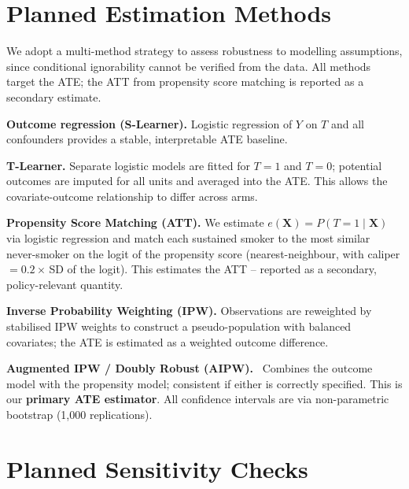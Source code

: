 \documentclass[11pt]{article}
\begin{document}
\section{Planned Estimation Methods}

We adopt a multi-method strategy to assess robustness to modelling assumptions, since conditional ignorability cannot be verified from the data. All methods target the ATE; the ATT from propensity score matching is reported as a secondary estimate.

\textbf{Outcome regression (S-Learner).} Logistic regression of $Y$ on $T$ and all confounders provides a stable, interpretable ATE baseline.

\textbf{T-Learner.} Separate logistic models are fitted for $T=1$ and $T=0$; potential outcomes are imputed for all units and averaged into the ATE. This allows the covariate-outcome relationship to differ across arms.

\textbf{Propensity Score Matching (ATT).} We estimate $e(\mathbf{X}) = P(T=1 \mid \mathbf{X})$ via logistic regression and match each sustained smoker to the most similar never-smoker on the logit of the propensity score (nearest-neighbour, with caliper $= 0.2 \times$\,SD of the logit). This estimates the ATT -- reported as a secondary, policy-relevant quantity.

\textbf{Inverse Probability Weighting (IPW).} Observations are reweighted by stabilised IPW weights to construct a pseudo-population with balanced covariates; the ATE is estimated as a weighted outcome difference.

\textbf{Augmented IPW / Doubly Robust (AIPW).}~\cite{robins1994} Combines the outcome model with the propensity model; consistent if either is correctly specified. This is our \textbf{primary ATE estimator}. All confidence intervals are via non-parametric bootstrap (1,000 replications).

\section{Planned Sensitivity Checks}
\label{sec:sensitivity}
\end{document}
